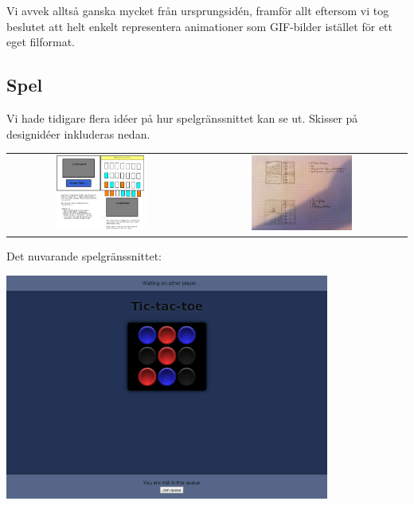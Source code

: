 \documentclass[a4paper,11pt]{article}
\begin{document}
\begin{appendices}
  Vi avvek alltså ganska mycket från ursprungsidén, framför allt eftersom vi
  tog beslutet att helt enkelt representera animationer som GIF-bilder
  istället för ett eget filformat.

\subsection{Spel}
  Vi hade tidigare flera idéer på hur spelgränssnittet kan se ut.  Skisser på
  designidéer inkluderas nedan.

  \begin{center}
    \begin{tabular}{c c}
      \includegraphics[width=0.5\textwidth]{images/sketch-game-1.png}
      &
      \includegraphics[width=0.5\textwidth]{images/sketch-game-2.jpg}
    \end{tabular}
  \end{center}



  Det nuvarande spelgränssnittet:

  \begin{center}
    \includegraphics[width=0.8\textwidth]{sepdata2.png}
  \end{center}


\end{appendices}
\end{document}
